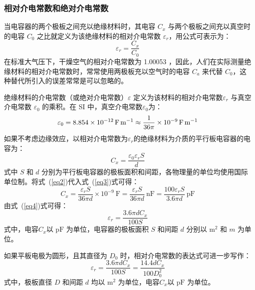 \documentclass[a4paper,utf8]{article}
\newcommand{\seqref}[1]{式~(\ref{#1})}
\begin{document}
        \subsubsection{相对介电常数和绝对介电常数}
            当电容器的两个极板之间充以绝缘材料时，其电容 $C_x$ 与两个极板之间充以真空时的电容 $C_0$ 之比就定义为该绝缘材料的相对介电常数 $\varepsilon_r$，用公式可表示为：
            \begin{equation}
                \varepsilon_r = \frac{C_x}{C_0}
            \end{equation}
            在标准大气压下，干燥空气的相对介电常数为 1.00053 ，因此，人们在实际测量绝缘材料的相对介电常数时，常常使用两极板充以空气时的电容 $C_a$ 来代替 $C_0$，这种替代所引入的误差常常是可以忽略的。\par
            绝缘材料的介电常数（或绝对介电常数）$\varepsilon$ 定义为该材料的相对介电常数$\varepsilon_r$ 与真空介电常数 $\varepsilon_0$ 的乘积。在 SI 中，真空介电常数$\varepsilon_0$为：
            \begin{equation}
                \varepsilon_0=\SI{8.854d-12}{\farad\per\metre}\approx \frac{1}{36\pi}\times\SI{e-9}{\farad\per\metre}\label{eq2}
            \end{equation}
            如果不考虑边缘效应，以相对介电常数为$\varepsilon_r$的绝缘材料为介质的平行板电容器的电容为：
            \begin{equation}
                C_x=\frac{\varepsilon_0 \varepsilon_r S}{d}\label{eq3}
            \end{equation}
            式中 $S$ 和 $d$ 分别为平行板电容器的极板面积和间距，各物理量的单位均使用国际单位制。将\seqref{eq2}代入\seqref{eq3}式可得：
            \begin{equation}
                C_{x}=\frac{\varepsilon_{r} S}{36 \pi d} \times 10^{-9} ~\unit{\farad}=\frac{\varepsilon_{r} S}{36 \pi d} ~\unit{\nano\farad}=\frac{100 \varepsilon_{r} S}{3.6 \pi d} ~\unit{\pico\farad}\label{eq4}
            \end{equation}
            由\seqref{eq4}式可得：
            \begin{equation}
                \varepsilon_r=\frac{3.6 \pi d C_x}{100 S}
            \end{equation}
            式中，电容$C_x$以 $\unit{\pico\farad}$ 为单位，电容器的极板面积 $S$ 和间距 $d$ 分别以 $\unit{\metre\squared}$ 和 $m$ 为单位。\par 
            如果平板电极为圆形，且其直径为 $D_0$ 时，相对介电常数的表达式可进一步写作：
            \begin{equation}
                \varepsilon_r=\frac{3.6\pi dC_x}{100S}=\frac{14.4dC_x}{100D_0^2}
            \end{equation}
            式中，极板直径 $D$ 和间距 $d$ 均以 $\unit{\metre\squared}$ 为单位，电容$C_x$以 $\unit{\pico\farad}$ 为单位。
\end{document}
